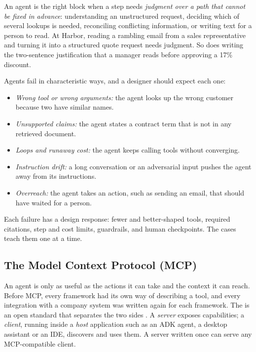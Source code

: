 An agent is the right block when a step needs \emph{judgment over a path that cannot be fixed in advance}: understanding an unstructured request, deciding which of several lookups is needed, reconciling conflicting information, or writing text for a person to read. At Harbor, reading a rambling email from a sales representative and turning it into a structured quote request needs judgment. So does writing the two-sentence justification that a manager reads before approving a 17\% discount.

Agents fail in characteristic ways, and a designer should expect each one:
\begin{itemize}[itemsep=1pt]
  \item \emph{Wrong tool or wrong arguments:} the agent looks up the wrong customer because two have similar names.
  \item \emph{Unsupported claims:} the agent states a contract term that is not in any retrieved document.
  \item \emph{Loops and runaway cost:} the agent keeps calling tools without converging.
  \item \emph{Instruction drift:} a long conversation or an adversarial input pushes the agent away from its instructions.
  \item \emph{Overreach:} the agent takes an action, such as sending an email, that should have waited for a person.
\end{itemize}
Each failure has a design response: fewer and better-shaped tools, required citations, step and cost limits, guardrails, and human checkpoints. The cases teach them one at a time.

\subsection{The Model Context Protocol (MCP)}
\label{sec:block-mcp}

An agent is only as useful as the actions it can take and the context it can reach. Before MCP, every framework had its own way of describing a tool, and every integration with a company system was written again for each framework. The  is an open standard that separates the two sides \citep{mcp2026spec}. A \emph{server} exposes capabilities; a \emph{client}, running inside a \emph{host} application such as an ADK agent, a desktop assistant or an IDE, discovers and uses them. A server written once can serve any MCP-compatible client.

